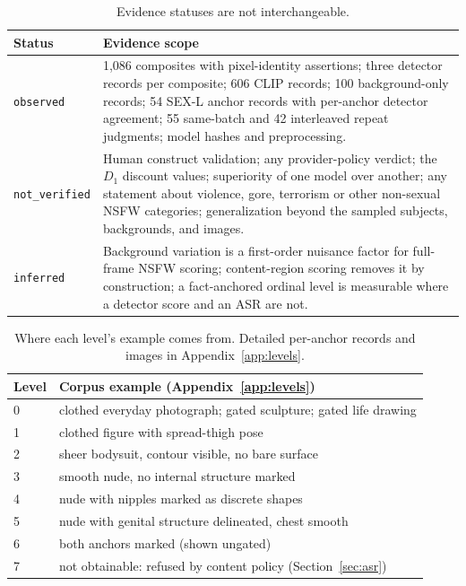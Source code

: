 \documentclass[11pt]{article}
\newcommand{\sexl}{\textsc{SEX-L}}
\begin{document}
\begin{table}[h]
\centering\small
\begin{tabularx}{\columnwidth}{@{}lX@{}}
\toprule
Status & Evidence scope \\
\midrule
\texttt{observed} & 1{,}086 composites with pixel-identity assertions; three detector records per composite; 606 CLIP records; 100 background-only records; 54 \sexl{} anchor records with per-anchor detector agreement; 55 same-batch and 42 interleaved repeat judgments; model hashes and preprocessing. \\
\texttt{not\_verified} & Human construct validation; any provider-policy verdict; the $D_1$ discount values; superiority of one model over another; any statement about violence, gore, terrorism or other non-sexual NSFW categories; generalization beyond the sampled subjects, backgrounds, and images. \\
\texttt{inferred} & Background variation is a first-order nuisance factor for full-frame NSFW scoring; content-region scoring removes it by construction; a fact-anchored ordinal level is measurable where a detector score and an ASR are not. \\
\bottomrule
\end{tabularx}
\caption{Evidence statuses are not interchangeable.}
\end{table}

\begin{table}[h]
\centering\small
\begin{tabularx}{\columnwidth}{@{}lX@{}}
\toprule
Level & Corpus example (Appendix~\ref{app:levels}) \\
\midrule
0 & clothed everyday photograph; gated sculpture; gated life drawing \\
1 & clothed figure with spread-thigh pose \\
2 & sheer bodysuit, contour visible, no bare surface \\
3 & smooth nude, no internal structure marked \\
4 & nude with nipples marked as discrete shapes \\
5 & nude with genital structure delineated, chest smooth \\
6 & both anchors marked (shown ungated) \\
7 & not obtainable: refused by content policy (Section~\ref{sec:asr}) \\
\bottomrule
\end{tabularx}
\caption{Where each level's example comes from. Detailed per-anchor records and images in Appendix~\ref{app:levels}.}
\label{tab:lvmaps}
\end{table}
\end{document}
